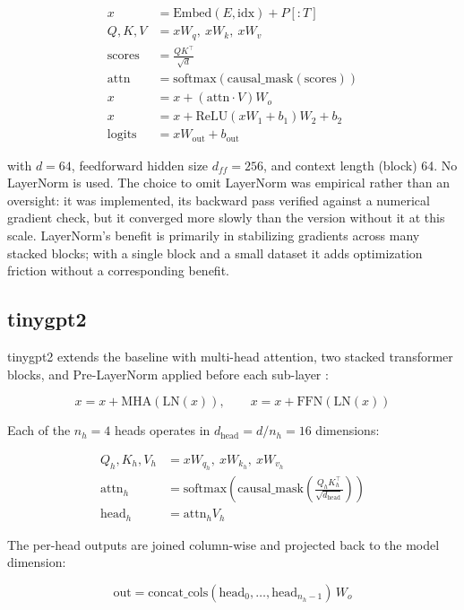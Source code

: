 \documentclass[conference]{IEEEtran}
\begin{document}
\begin{align}
x &= \text{Embed}(E, \text{idx}) + P[:T] \\
Q, K, V &= xW_q,\ xW_k,\ xW_v \\
\text{scores} &= \frac{QK^\top}{\sqrt{d}} \\
\text{attn} &= \text{softmax}(\text{causal\_mask}(\text{scores})) \\
x &= x + (\text{attn} \cdot V) W_o \\
x &= x + \text{ReLU}(xW_1 + b_1)W_2 + b_2 \\
\text{logits} &= xW_{\text{out}} + b_{\text{out}}
\end{align}

with $d=64$, feedforward hidden size $d_{ff}=256$, and context length (block) 64. No LayerNorm is used. The choice to omit LayerNorm was empirical rather than an oversight: it was implemented, its backward pass verified against a numerical gradient check, but it converged more slowly than the version without it at this scale. LayerNorm's benefit is primarily in stabilizing gradients across many stacked blocks; with a single block and a small dataset it adds optimization friction without a corresponding benefit.

\subsection{tinygpt2}
tinygpt2 extends the baseline with multi-head attention, two stacked transformer blocks, and Pre-LayerNorm applied before each sub-layer \cite{ba2016layernorm}:

\begin{equation}
x = x + \text{MHA}(\text{LN}(x)), \qquad x = x + \text{FFN}(\text{LN}(x))
\end{equation}

Each of the $n_h=4$ heads operates in $d_{\text{head}} = d/n_h = 16$ dimensions:

\begin{align}
Q_h, K_h, V_h &= xW_{q_h},\ xW_{k_h},\ xW_{v_h} \\
\text{attn}_h &= \text{softmax}\left(\text{causal\_mask}\left(\frac{Q_hK_h^\top}{\sqrt{d_{\text{head}}}}\right)\right) \\
\text{head}_h &= \text{attn}_h V_h
\end{align}

The per-head outputs are joined column-wise and projected back to the model dimension:

\begin{equation}
\text{out} = \text{concat\_cols}(\text{head}_0, \ldots, \text{head}_{n_h-1})\, W_o
\end{equation}
\end{document}
